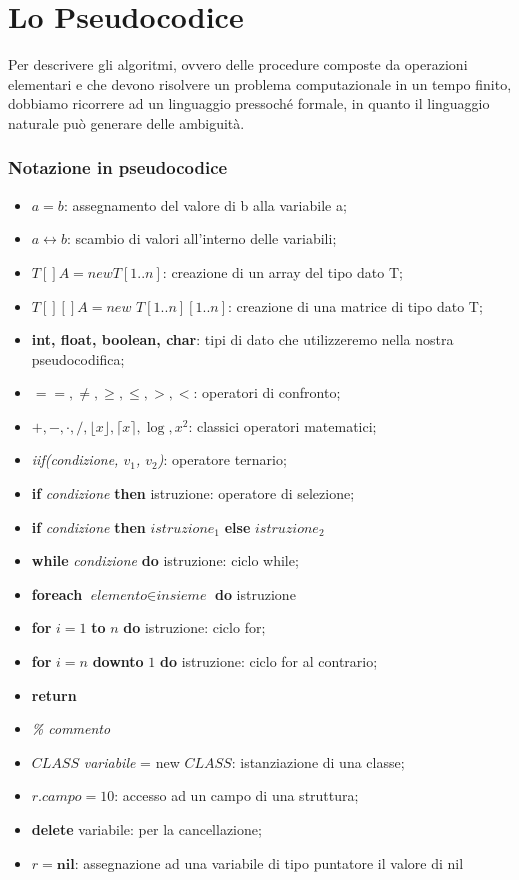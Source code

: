 \documentclass[../cheatSheetAlgoritmi.tex]{subfiles}
\begin{document}
\chapter{Lo Pseudocodice}
Per descrivere gli algoritmi, ovvero delle procedure composte da operazioni elementari e che devono risolvere un problema computazionale in un tempo finito, dobbiamo ricorrere ad un linguaggio pressoché formale, in quanto il linguaggio naturale può generare delle ambiguità.
\subsection{Notazione in pseudocodice}
\begin{itemize}
  	\item $a=b$: assegnamento del valore di b alla variabile a;
  	\item $a \leftrightarrow b$: scambio di valori all'interno delle variabili;
  	\item $T[] A = new T[1..n]$: creazione di un array del tipo dato T;
  	\item $T[][] A = new$ $T[1..n][1..n]$: creazione di una matrice di tipo dato T;
  	\item \textbf{int, float, boolean, char}: tipi di dato che utilizzeremo nella nostra pseudocodifica;
  	\item $==, \neq, \geq, \leq, >, <$: operatori di confronto;
  	\item $+, -, \cdot, /, \lfloor x \rfloor, \lceil x \rceil, \log, x^2$: classici operatori matematici;
  	\item \textit{iif(condizione, $v_1$, $v_2$)}: operatore ternario;
  	\item \textbf{if} \textit{condizione} \textbf{then} istruzione: operatore di selezione;
  	\item \textbf{if} \textit{condizione} \textbf{then} $istruzione_1$ \textbf{else} $istruzione_2$
  	\item \textbf{while} \textit{condizione} \textbf{do} istruzione: ciclo while;
  	\item \textbf{foreach} $\textit{elemento} \in \textit{insieme}$ \textbf{do} istruzione
  	\item \textbf{for} $i = 1$ \textbf{to} $n$ \textbf{do} istruzione: ciclo for;
  	\item \textbf{for} $i = n$ \textbf{downto} $1$ \textbf{do} istruzione: ciclo for al contrario;
  	\item \textbf{return}
  	\item \textit{\% commento}
  	\item $CLASS$ \textit{variabile} = new $CLASS$: istanziazione di una classe;
  	\item $\textit{r.campo}= 10$: accesso ad un campo di una struttura;
  	\item \textbf{delete} variabile: per la cancellazione;
	\item $r = \textbf{nil}$: assegnazione ad una variabile di tipo puntatore il valore di nil
\end{itemize}
\end{document}
